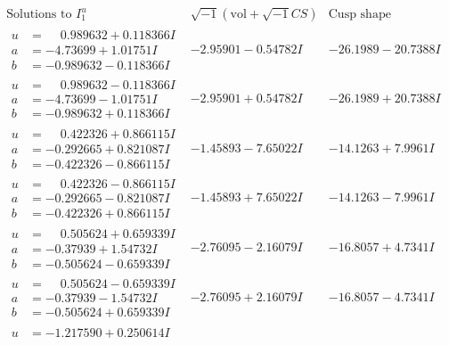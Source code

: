 \documentclass[1p]{elsarticle_modified}
\theoremstyle{definition}
\newcommand{\I}{\sqrt{-1}}
\begin{document}
$$\begin{array}{c|c|c}  
\text{Solutions to }I^u_{1}& \I (\text{vol} + \sqrt{-1}CS) & \text{Cusp shape}\\
 \hline 
\begin{aligned}
u &= \phantom{-}0.989632 + 0.118366 I \\
a &= -4.73699 + 1.01751 I \\
b &= -0.989632 - 0.118366 I\end{aligned}
 & -2.95901 - 0.54782 I & -26.1989 - 20.7388 I \\ \hline\begin{aligned}
u &= \phantom{-}0.989632 - 0.118366 I \\
a &= -4.73699 - 1.01751 I \\
b &= -0.989632 + 0.118366 I\end{aligned}
 & -2.95901 + 0.54782 I & -26.1989 + 20.7388 I \\ \hline\begin{aligned}
u &= \phantom{-}0.422326 + 0.866115 I \\
a &= -0.292665 + 0.821087 I \\
b &= -0.422326 - 0.866115 I\end{aligned}
 & -1.45893 - 7.65022 I & -14.1263 + 7.9961 I \\ \hline\begin{aligned}
u &= \phantom{-}0.422326 - 0.866115 I \\
a &= -0.292665 - 0.821087 I \\
b &= -0.422326 + 0.866115 I\end{aligned}
 & -1.45893 + 7.65022 I & -14.1263 - 7.9961 I \\ \hline\begin{aligned}
u &= \phantom{-}0.505624 + 0.659339 I \\
a &= -0.37939 + 1.54732 I \\
b &= -0.505624 - 0.659339 I\end{aligned}
 & -2.76095 - 2.16079 I & -16.8057 + 4.7341 I \\ \hline\begin{aligned}
u &= \phantom{-}0.505624 - 0.659339 I \\
a &= -0.37939 - 1.54732 I \\
b &= -0.505624 + 0.659339 I\end{aligned}
 & -2.76095 + 2.16079 I & -16.8057 - 4.7341 I \\ \hline\begin{aligned}
u &= -1.217590 + 0.250614 I \\

\end{aligned}
\end{array}$$
\end{document}
